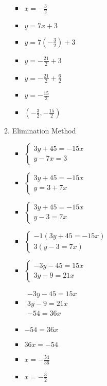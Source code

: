 \begin{enumerate}
\begin{enumerate}
\begin{itemize}
    \item {\Large $x=-\frac{3}{2}$}
    \item $y=7x+3$
    \item {\Large $y=7\left(-\frac{3}{2}\right)+3$}
    \item {\Large $y=-\frac{21}{2}+3$}
    \item {\Large $y=-\frac{21}{2}+\frac{6}{2}$}
    \item {\Large $y=-\frac{15}{2}$}
    \item {\Large $\left(-\frac{3}{2},-\frac{15}{2}\right)$}
    \end{itemize}
  \item Elimination Method
    \begin{itemize}
    \item $\left\{ \begin{array}{l}
          3y+45=-15x \\
          y-7x=3 \end{array} \right.$
    \item $\left\{ \begin{array}{l}
          3y+45=-15x \\
          y=3+7x \end{array} \right.$
    \item $\left\{ \begin{array}{l}
          3y+45=-15x \\
          y-3=7x \end{array} \right.$
    \item $\left\{ \begin{array}{l}
          -1(3y+45=-15x) \\
          3(y-3=7x) \end{array} \right.$
    \item $\left\{ \begin{array}{l}
          -3y-45=15x \\
          3y-9=21x \end{array} \right.$
    \item $\begin{array}{l}
          -3y-45=15x \\
          3y-9=21x \\ \hline
          -54=36x \end{array}$
    \item $-54=36x$
    \item $36x=-54$
    \item {\Large $x=-\frac{54}{36}$}
    \item {\Large $x=-\frac{3}{2}$}

\end{itemize}
\end{enumerate}
\end{enumerate}
